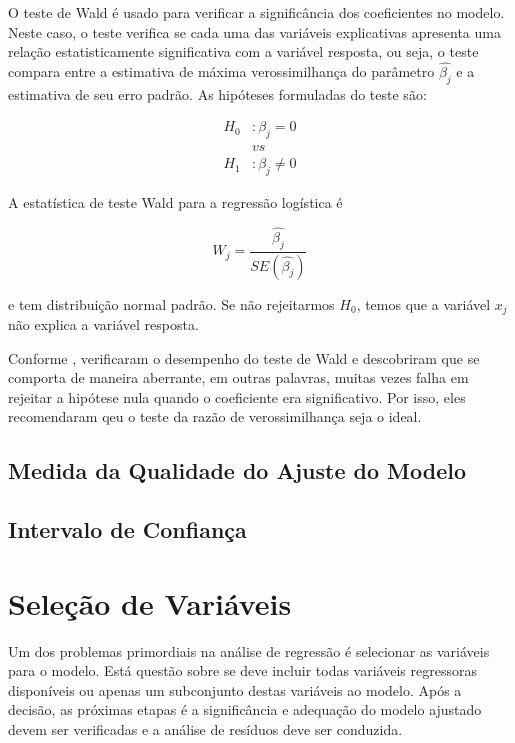 \documentclass[
	12pt,				%
	openright,			%
	oneside,      %
	a4paper,			%
	english,			%
	french,				%
	spanish,			%
	brazil,				%
	]{abntex2}\usepackage[]{graphicx}\usepackage[table]{xcolor}
\theoremstyle{definition}
\begin{document}
O teste de Wald é usado para verificar a significância dos coeficientes no modelo. Neste caso, o teste verifica se cada uma das variáveis explicativas apresenta uma relação estatisticamente significativa com a variável resposta, ou seja, o teste compara entre a estimativa de máxima verossimilhança do parâmetro $\hat{\beta_j}$ e a estimativa de seu erro padrão. As hipóteses formuladas do teste são:

\begin{equation}
\begin{split}
H_0 & : \beta_j = 0 \\
    & vs\\
H_1 & : \beta_j \neq 0
\end{split}
\end{equation}

A estatística de teste Wald para a regressão logística é

\begin{equation*}
  W_j = \frac{\hat{\beta_j}}{SE(\hat{\beta_j})}
\end{equation*}

\noindent e tem distribuição normal padrão. Se não rejeitarmos $H_0$, temos que a variável $x_j$ não explica a variável resposta.

Conforme \cite{hauck1977wald}, verificaram o desempenho do teste de Wald e descobriram que se comporta de maneira aberrante, em outras palavras, muitas vezes falha em rejeitar a hipótese nula quando o coeficiente era significativo. Por isso, eles recomendaram qeu o teste da razão de verossimilhança seja o ideal.




      \subsection{Medida da Qualidade do Ajuste do Modelo}
      
      
      \subsection{Intervalo de Confiança}
      
      \section{Seleção de Variáveis}
    
Um dos problemas primordiais na análise de regressão é selecionar as variáveis para o modelo. Está questão sobre se deve incluir todas variáveis regressoras disponíveis ou apenas um subconjunto destas variáveis ao modelo. Após a decisão, as próximas etapas é a significância e adequação do modelo ajustado devem ser verificadas e a análise de resíduos deve ser conduzida. 
\end{document}
